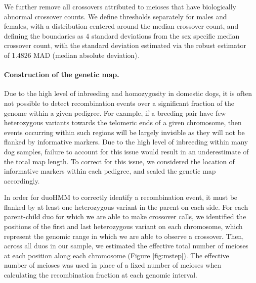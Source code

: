 We further remove all crossovers attributed to meioses that have biologically abnormal crossover counts.
We define thresholds separately for males and females, with a distribution centered around the median crossover count, and defining the boundaries as 4 standard deviations from the sex specific median crossover count, with the standard deviation estimated via the robust estimator of 1.4826 MAD (median absolute deviation).

\paragraph{Construction of the genetic map.}
Due to the high level of inbreeding and homozygosity in domestic dogs,
it is often not possible to detect recombination events over a significant fraction of the genome within a given pedigree.
For example, if a breeding pair have few heterozygous variants towards the telomeric ends of a given chromosome, then events occurring within such regions will be largely invisible as they will not be flanked by informative markers.
Due to the high level of inbreeding within many dog samples, failure to account for this issue would result in an underestimate of the total map length.
To correct for this issue, we considered the location of informative markers within each pedigree, and scaled the genetic map accordingly.

In order for duoHMM to correctly identify a recombination event, it must be flanked by at least one heterozygous variant in the parent on each side.
For each parent-child duo for which we are able to make crossover calls, we identified the positions of the first and last heterozygous variant on each chromosome, which represent the genomic range in which we are able to observe a crossover.
Then, across all duos in our sample, we estimated the effective total number of meioses at each position along each chromosome (Figure \ref{fig:mstep}).
The effective number of meioses was used in place of a fixed number of meioses when calculating the recombination fraction at each genomic interval.

